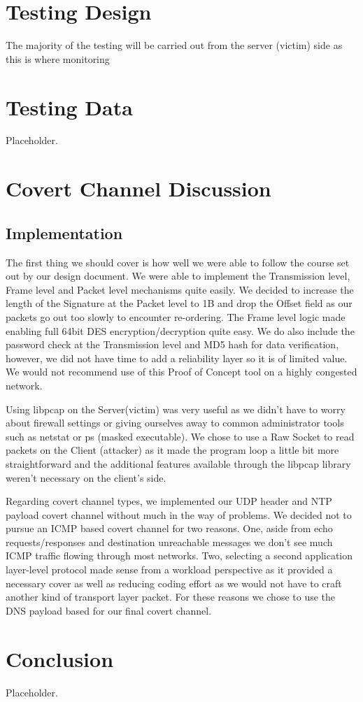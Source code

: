 \documentclass[titlepage]{article}
\begin{document}
\section{Testing Design}

The majority of the testing will be carried out from the server (victim) side as this is where monitoring

\section{Testing Data}

Placeholder.

\section{Covert Channel Discussion}

\subsection{Implementation}

The first thing we should cover is how well we were able to follow the course set out by our design document.  We were able to implement the Transmission level, Frame level and Packet level mechanisms quite easily.  We decided to increase the length of the Signature at the Packet level to 1B and drop the Offset field as our packets go out too slowly to encounter re-ordering.  The Frame level logic made enabling full 64bit DES encryption/decryption quite easy.  We do also include the password check at the Transmission level and MD5 hash for data verification, however, we did not have time to add a reliability layer so it is of limited value. We would not recommend use of this Proof of Concept tool on a highly congested network.

Using libpcap on the Server(victim) was very useful as we didn't have to worry about firewall settings or giving ourselves away to common administrator tools such as netstat or ps (masked executable).  We chose to use a Raw Socket to read packets on the Client (attacker) as it made the program loop a little bit more straightforward and the additional features available through the libpcap library weren't necessary on the client's side.

Regarding covert channel types, we implemented our UDP header and NTP payload covert channel without much in the way of problems.  We decided not to pursue an ICMP based covert channel for two reasons. One, aside from echo requests/responses and destination unreachable messages we don't see much ICMP traffic flowing through most networks. Two, selecting a second application layer-level protocol made sense from a workload perspective as it provided a necessary cover as well as reducing coding effort as we would not have to craft another kind of transport layer packet.  For these reasons we chose to use the DNS payload based for our final covert channel.



\section{Conclusion}

Placeholder.
\end{document}
